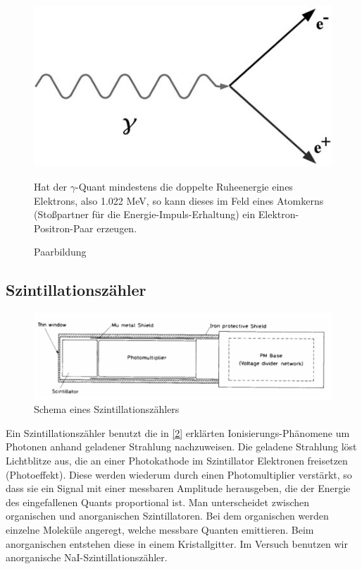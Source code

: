 \begin{figure}[H]
	\begin{minipage}{0.5\textwidth}
	\centering \includegraphics[width=\textwidth]{BilderTheorie/Paarbildung.jpg}
	\caption{Paarbildung}
	\end{minipage}
	\begin{minipage}{0.5\textwidth}
	Hat der $\gamma$-Quant mindestens die doppelte Ruheenergie eines Elektrons, also 1.022 MeV, so kann dieses im Feld eines Atomkerns (Stoßpartner für die Energie-Impuls-Erhaltung) ein Elektron-Positron-Paar erzeugen. 
	\end{minipage}
\end{figure}


\subsection{Szintillationszähler}

\begin{figure}[H]
	\centering \includegraphics[width=\textwidth]{BilderTheorie/Szinti.png}
	\caption{Schema eines Szintillationszählers}
\end{figure}

Ein Szintillationszähler benutzt die in \ref{2} erklärten Ionisierungs-Phänomene um Photonen anhand geladener Strahlung nachzuweisen. Die geladene Strahlung löst Lichtblitze aus, die an einer Photokathode im Szintillator Elektronen freisetzen (Photoeffekt). Diese werden wiederum durch einen Photomultiplier verstärkt, so dass sie ein Signal mit einer messbaren Amplitude herausgeben, die der Energie des eingefallenen Quants proportional ist. Man unterscheidet zwischen organischen und anorganischen Szintillatoren. Bei dem organischen werden einzelne Moleküle angeregt, welche messbare Quanten emittieren. Beim anorganischen entstehen diese in einem Kristallgitter. Im Versuch benutzen wir anorganische NaI-Szintillationszähler.

